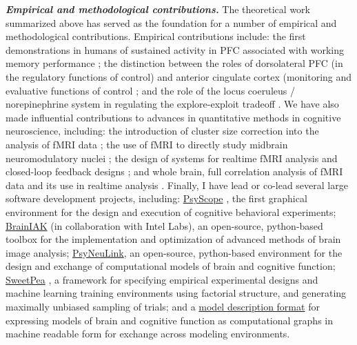 \documentclass[10 pt]{article}
\begin{document}
\textit{\textbf{Empirical and methodological contributions.}} The theoretical work summarized above has served as
the foundation for a number of empirical and methodological contributions. Empirical contributions include: the
first demonstrations in humans of sustained activity in PFC associated with working memory performance
\cite{cohen1994activation}\cite{cohen1997temporal}; the distinction between the roles of dorsolateral PFC (in the
regulatory functions of control) and anterior cingulate cortex (monitoring and evaluative functions of control
\cite{carter1998anterior}\cite{botvinick1999conflict}\cite{macdonald2000dissociating}\cite{kerns2004anterior}; and
the role of the locus coeruleus / norepinephrine system in regulating the explore-exploit tradeoff
\cite{gilzenrat2010pupil}\cite{kane2017increased}. We have also made influential contributions to advances in quantitative methods in cognitive neuroscience, including: the introduction of cluster size correction into the analysis of fMRI data \cite{casey1998reproducibility}; the use of fMRI to directly study midbrain neuromodulatory nuclei \cite{dardenne2008bold}; the design of systems for realtime fMRI analysis \cite{forman1995improved}\cite{wallace2022rt-cloud} and closed-loop feedback designs \cite{debettencourt2015closed-loop}\cite{mennen2021cloudbased}; and whole brain, full correlation analysis of fMRI data and its use in realtime analysis \cite{wang2015full}. Finally, I have lead or co-lead several large software development projects, including: \href{https://en.wikipedia.org/wiki/PsyScope}{PsyScope} \cite{cohen1993psyscope}, the first graphical environment for the design and execution of cognitive behavioral experiments; \href{http://BrainIAK.org}{BrainIAK} \cite{kumar2021brainiak}\cite{wallace2022rt-cloud} (in collaboration with Intel Labs), an open-source, python-based toolbox for the implementation and optimization of advanced methods of brain image analysis; \href{https://psyneuln.deptcpanel.princeton.edu/}{PsyNeuLink}, an open-source, python-based environment for the design and exchange of computational models of brain and cognitive function; \href{https://sites.google.com/view/sweetpea-ai/}{SweetPea} \cite{musslick2022sweetpea}, a framework for specifying empirical experimental designs and machine learning training environments using factorial structure, and generating maximally unbiased sampling of trials; and a \href{https://modeci.github.io/Website/}{model description format} \cite{gleeson2023integrating} for expressing models of brain and cognitive function as computational graphs in machine readable form for exchange across modeling environments.
\end{document}
